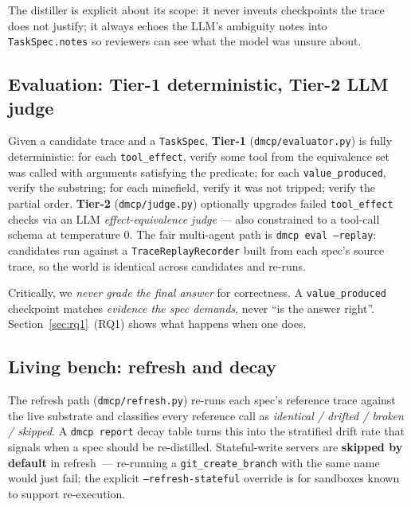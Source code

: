 The distiller is explicit about its scope: it never invents checkpoints
the trace does not justify; it always echoes the LLM's ambiguity notes
into \texttt{TaskSpec.notes} so reviewers can see what the model was
unsure about.



\subsection{Evaluation: Tier-1 deterministic, Tier-2 LLM judge}
\label{sec:method:eval}

Given a candidate trace and a \texttt{TaskSpec}, \textbf{Tier-1}
(\texttt{dmcp/evaluator.py}) is fully deterministic: for each
\texttt{tool\_effect}, verify some tool from the equivalence set was
called with arguments satisfying the predicate; for each
\texttt{value\_produced}, verify the substring; for each minefield,
verify it was not tripped; verify the partial order. \textbf{Tier-2}
(\texttt{dmcp/judge.py}) optionally upgrades failed
\texttt{tool\_effect} checks via an LLM \emph{effect-equivalence judge}
--- also constrained to a tool-call schema at temperature $0$. The fair
multi-agent path is \texttt{dmcp eval --replay}: candidates run against
a \texttt{TraceReplayRecorder} built from each spec's source trace, so
the world is identical across candidates and re-runs.

Critically, we \emph{never grade the final answer} for correctness. A
\texttt{value\_produced} checkpoint matches \emph{evidence the spec
demands}, never ``is the answer right''. Section~\ref{sec:rq1}~(RQ1)
shows what happens when one does.

\subsection{Living bench: refresh and decay}
\label{sec:method:refresh}

The refresh path (\texttt{dmcp/refresh.py}) re-runs each spec's
reference trace against the live substrate and classifies every
reference call as \emph{identical / drifted / broken / skipped}. A
\texttt{dmcp report} decay table turns this into the stratified drift
rate that signals when a spec should be re-distilled. Stateful-write
servers are \textbf{skipped by default} in refresh~--- re-running a
\texttt{git\_create\_branch} with the same name would just fail; the
explicit \texttt{--refresh-stateful} override is for sandboxes known
to support re-execution.

